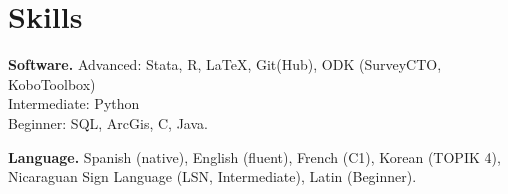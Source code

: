 \documentclass[a4paper, 10pt]{article}
\renewenvironment{itemize}{
  \begin{list}{}
    { \setlength{\itemsep}{5pt}
      \setlength{\parsep}{0pt}
      \setlength{\topsep}{0pt}
      \setlength{\leftmargin}{0em} } }{
  \end{list}}
\begin{document}

\section*{Skills}
\begin{itemize}
\item \textbf{Software.} \newline Advanced: Stata, R, \LaTeX, Git(Hub), ODK
(SurveyCTO, KoboToolbox) \\
Intermediate: Python \\
Beginner: SQL, ArcGis, C, Java.
\item \textbf{Language.} \newline Spanish (native), English (fluent), French
(C1), Korean (TOPIK 4), Nicaraguan Sign Language (LSN, Intermediate), Latin
(Beginner).
\end{itemize}
\bigskip


\end{document}
